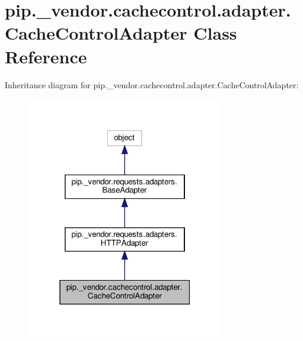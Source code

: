 \hypertarget{classpip_1_1__vendor_1_1cachecontrol_1_1adapter_1_1CacheControlAdapter}{}\section{pip.\+\_\+vendor.\+cachecontrol.\+adapter.\+Cache\+Control\+Adapter Class Reference}
\label{classpip_1_1__vendor_1_1cachecontrol_1_1adapter_1_1CacheControlAdapter}


Inheritance diagram for pip.\+\_\+vendor.\+cachecontrol.\+adapter.\+Cache\+Control\+Adapter\+:
\nopagebreak
\begin{figure}[H]
\begin{center}
\leavevmode
\includegraphics[width=244pt]{classpip_1_1__vendor_1_1cachecontrol_1_1adapter_1_1CacheControlAdapter__inherit__graph}
\end{center}
\end{figure}


